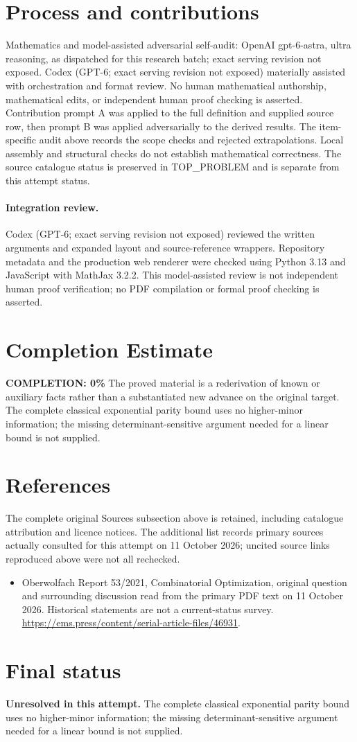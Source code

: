 \documentclass[11pt]{article}
\begin{document}
\section{Process and contributions}
Mathematics and model-assisted adversarial self-audit: OpenAI gpt-6-astra, ultra reasoning, as dispatched for this research batch; exact serving revision not exposed. Codex (GPT-6; exact serving revision not exposed) materially assisted with orchestration and format review. No human mathematical authorship, mathematical edits, or independent human proof checking is asserted.
Contribution prompt A was applied to the full definition and supplied source row, then prompt B was applied adversarially to the derived results. The item-specific audit above records the scope checks and rejected extrapolations. Local assembly and structural checks do not establish mathematical correctness. The source catalogue status is preserved in TOP\_PROBLEM and is separate from this attempt status.
\paragraph{Integration review.} Codex (GPT-6; exact serving revision not exposed) reviewed the written arguments and expanded layout and source-reference wrappers. Repository metadata and the production web renderer were checked using Python 3.13 and JavaScript with MathJax 3.2.2. This model-assisted review is not independent human proof verification; no PDF compilation or formal proof checking is asserted.

\section{Completion Estimate}
\noindent\textbf{COMPLETION: 0\%}
The proved material is a rederivation of known or auxiliary facts rather than a substantiated new advance on the original target. The complete classical exponential parity bound uses no higher-minor information; the missing determinant-sensitive argument needed for a linear bound is not supplied.
\section{References}
The complete original Sources subsection above is retained, including catalogue attribution and licence notices. The additional list records primary sources actually consulted for this attempt on 11 October 2026; uncited source links reproduced above were not all rechecked.
\begin{itemize}
\item Oberwolfach Report 53/2021, Combinatorial Optimization, original question and surrounding discussion read from the primary PDF text on 11 October 2026. Historical statements are not a current-status survey. \url{https://ems.press/content/serial-article-files/46931}.
\end{itemize}
\section{Final status}
\textbf{Unresolved in this attempt.} The complete classical exponential parity bound uses no higher-minor information; the missing determinant-sensitive argument needed for a linear bound is not supplied.
\end{document}
